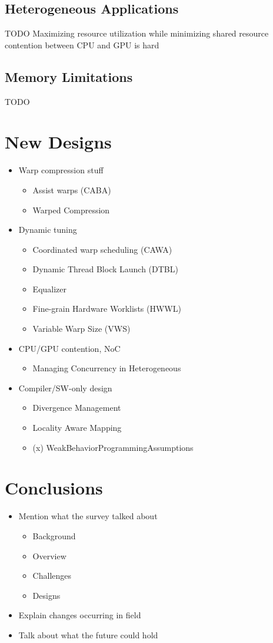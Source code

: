 \documentclass[prodmode,acmtecs]{acmsmall} %
\begin{document}
\subsection{Heterogeneous Applications}
TODO
Maximizing resource utilization while minimizing shared resource contention between CPU and GPU is hard
\subsection{Memory Limitations}
TODO

\section{New Designs}
\begin{itemize}
\item Warp compression stuff
  \begin{itemize}
  \item Assist warps (CABA)
  \item Warped Compression
  \end{itemize}
\item Dynamic tuning
  \begin{itemize}
  \item Coordinated warp scheduling (CAWA)
  \item Dynamic Thread Block Launch (DTBL)
  \item Equalizer
  \item Fine-grain Hardware Worklists (HWWL)
  \item Variable Warp Size (VWS)
  \end{itemize}
\item CPU/GPU contention, NoC
  \begin{itemize}
  \item Managing Concurrency in Heterogeneous
  \end{itemize}
\item Compiler/SW-only design
  \begin{itemize}
  \item Divergence Management
  \item Locality Aware Mapping
  \item (x) WeakBehaviorProgrammingAssumptions
  \end{itemize}
\end{itemize}

\section{Conclusions}
\begin{itemize}
\item Mention what the survey talked about
  \begin{itemize}
  \item Background
  \item Overview
  \item Challenges
  \item Designs
  \end{itemize}
\item Explain changes occurring in field
\item Talk about what the future could hold
\end{itemize}
\end{document}
